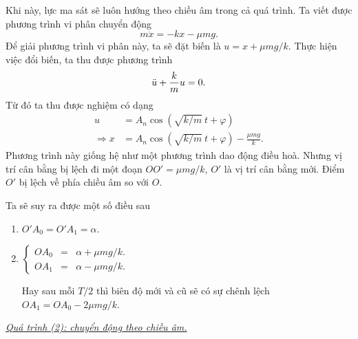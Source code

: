 \documentclass[12pt]{article}
\begin{document}
Khi này, lực ma sát sẽ luôn hướng theo chiều âm trong cả quá trình. Ta viết được phương trình vi phân chuyển động
\begin{equation}
    m \ddot{x} =  - k x - \mu  m g.
    \label{eq:1.4}
\end{equation}
Để giải phương trình vi phân này, ta sẽ đặt biến là $u = x + \mu mg/k$. Thực hiện việc đổi biến, ta thu được phương trình
\begin{equation*}
    \ddot{u} + {\frac{k}{m} \displaystyle} u = 0.
\end{equation*}
Từ đó ta thu được nghiệm có dạng
\begin{equation}
    \begin{split}
        u &= A_n \cos{\left(\sqrt{k/m} \ t + \varphi \right)} \\
        \Rightarrow x &= A_n \cos{\left(\sqrt{k/m} \ t + \varphi \right)} - {\displaystyle \frac{\mu m g}{k}}.
    \end{split}
    \label{eq:1.5}
\end{equation}
Phương trình này giống hệ như một phương trình dao động điều hoà. Nhưng vị trí cân bằng bị lệch đi một đoạn $OO' = \mu m g/k$, $O'$ là vị trí cân bằng mới. Điểm $O'$ bị lệch về phía chiều âm so với $O$.
\begin{figure}[!htb]
    \centering
    
    \caption{}
    \label{fig:1.3}
\end{figure}

Ta sẽ suy ra được một số điều sau
\begin{enumerate}
    \item \(O'A_0 = O'A_1 = \alpha\).
    \item 
    \(
    \left\{
        \begin{array}{ccc}
        OA_0 &=& \alpha + \mu mg/k. \\ 
        OA_1 &=& \alpha - \mu mg/k.
        \end{array}
    \right.
    \)
    
    Hay sau mỗi \(T/2\) thì biên độ mới và cũ sẽ có sự chênh lệch
    \(OA_1 = OA_0 - 2 \mu mg/k\).
\end{enumerate}
\vspace{2mm}

\underline{\textit{Quá trình (2): chuyển động theo chiều âm.}}
\vspace{2mm}
\end{document}
